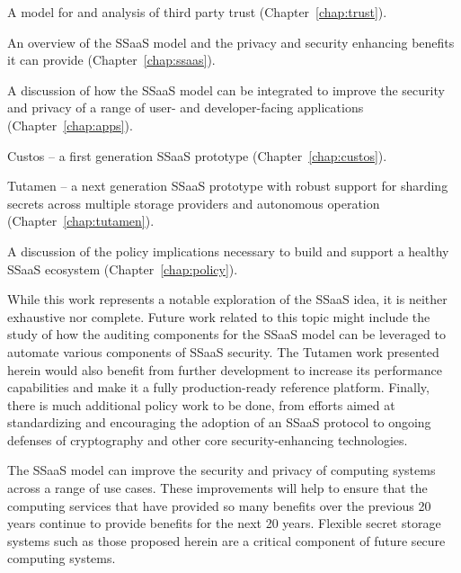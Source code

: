 \begin{packed_item}
\item A model for and analysis of third party trust
  (Chapter~\ref{chap:trust}).
\item An overview of the SSaaS model and the privacy and security
  enhancing benefits it can provide (Chapter~\ref{chap:ssaas}).
\item A discussion of how the SSaaS model can be integrated to improve
  the security and privacy of a range of user- and developer-facing
  applications (Chapter~\ref{chap:apps}).
\item Custos -- a first generation SSaaS prototype
  (Chapter~\ref{chap:custos}).
\item Tutamen -- a next generation SSaaS prototype with robust support
  for sharding secrets across multiple storage providers and
  autonomous operation (Chapter~\ref{chap:tutamen}).
\item A discussion of the policy implications necessary to build and
  support a healthy SSaaS ecosystem (Chapter~\ref{chap:policy}).
\end{packed_item}

While this work represents a notable exploration of the SSaaS idea, it
is neither exhaustive nor complete. Future work related to this topic
might include the study of how the auditing components for the SSaaS
model can be leveraged to automate various components of SSaaS
security. The Tutamen work presented herein would also benefit from
further development to increase its performance capabilities and make
it a fully production-ready reference platform. Finally, there is much
additional policy work to be done, from efforts aimed at standardizing
and encouraging the adoption of an SSaaS protocol to ongoing defenses
of cryptography and other core security-enhancing technologies.

The SSaaS model can improve the security and privacy of computing
systems across a range of use cases. These improvements will help to
ensure that the computing services that have provided so many benefits
over the previous 20 years continue to provide benefits for the next
20 years. Flexible secret storage systems such as those proposed
herein are a critical component of future secure computing systems.

